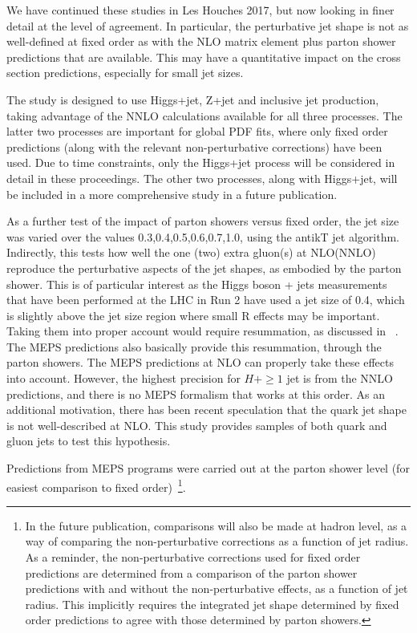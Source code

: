 \documentclass[aps,prd,onecolumn,fleqn,superscriptaddress,groupedaddress,nofootinbib,preprintnumbers,nobalancelastpage]{revtex4}
\begin{document}
We have continued these studies in Les Houches 2017, but now looking in finer detail at 
the level of agreement. In particular, the perturbative jet shape is not as
well-defined at fixed order as with the NLO matrix element plus parton shower
predictions that are available. This may have a quantitative impact on the cross
section predictions, especially for small jet sizes.   

The study is designed to use Higgs+jet, Z+jet and inclusive jet production,
taking advantage of the NNLO calculations available for all three processes.
The latter two processes are important for global PDF fits, where
only fixed order predictions (along with the relevant non-perturbative
corrections) have been used. 
Due to time constraints, only the Higgs+jet process will be considered in detail
in these proceedings. The other two processes, along with Higgs+jet,  will be
included in a more comprehensive study in a future publication. 

As a  further test of the impact of parton showers versus fixed order, the jet
size was varied over the values 0.3,0.4,0.5,0.6,0.7,1.0, using the antikT jet
algorithm. Indirectly, this tests how well the one (two) extra gluon(s) at
NLO(NNLO) reproduce the perturbative aspects of the jet shapes, as embodied by
the parton shower. This is of particular interest as the Higgs boson + jets measurements that have been performed at the LHC in Run 2 have used a jet size of 0.4, which is 
slightly above the jet size region where small R effects may be important. Taking them into proper account would require resummation, as discussed in ~\cite{}. The MEPS predictions also basically provide this resummation, through the parton showers. The 
MEPS predictions at NLO can properly take these effects into account. However, the highest precision for $H+\ge1$ jet is from the NNLO predictions, and there is no MEPS formalism that works at this order.   As an additional motivation, there has been recent speculation that the quark jet shape is
not well-described at NLO. This study provides samples of both quark and gluon
jets to test this hypothesis.

  Predictions from MEPS programs were carried out
at the parton shower level (for easiest comparison to fixed order)~\footnote{In
the future publication, comparisons will also be made at hadron level, as a way
of comparing the non-perturbative corrections as a function of jet radius.  As a
reminder, the non-perturbative corrections used for fixed order predictions are
determined from a comparison of the parton shower predictions with and without
the non-perturbative effects, as a function of jet radius. This implicitly
requires the integrated jet shape determined by fixed order predictions to agree
with those determined by parton showers.}.
\end{document}
